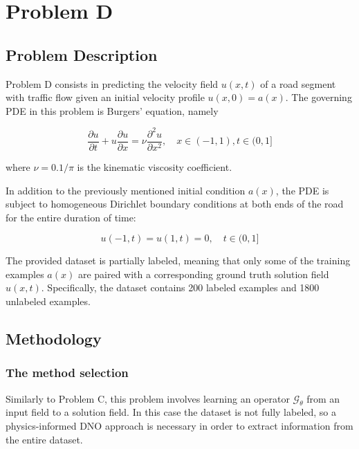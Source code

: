 

\chapter{Problem D}
\label{ch:problem_D}
%
\section{Problem Description}
%

Problem D consists in predicting the velocity field $u(x,t)$ of a road segment with traffic flow given an initial velocity profile $u(x,0) = a(x)$. The governing PDE in this problem is Burgers' equation, namely

\begin{equation}
	\frac{\partial u}{\partial t} + u \frac{\partial u}{\partial x} = \nu \frac{\partial^2 u}{\partial x^2}, \quad x\in (-1,1), t\in (0,1]
\end{equation}

\noindent
where $\nu = 0.1/\pi$ is the kinematic viscosity coefficient.

In addition to the previously mentioned initial condition $a(x)$, the PDE is subject to homogeneous Dirichlet boundary conditions at both ends of the road for the entire duration of time:

\begin{equation}
	u(-1,t) = u(1,t) = 0, \quad t\in (0,1]
\end{equation}

The provided dataset is partially labeled, meaning that only some of the training examples $a(x)$ are paired with a corresponding ground truth solution field $u(x,t)$. Specifically, the dataset contains 200 labeled examples and 1800 unlabeled examples.

\section{Methodology}
%
\subsection{The method selection}
%

Similarly to Problem C, this problem involves learning an operator $\mathcal{G}_\theta$ from an input field to a solution field. In this case the dataset is not fully labeled, so a physics-informed DNO approach is necessary in order to extract information from the entire dataset.

